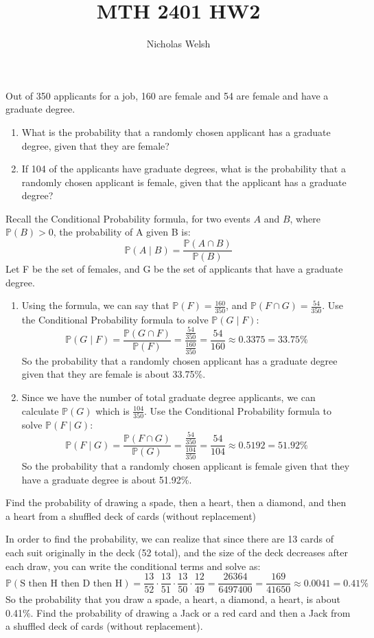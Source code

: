\documentclass{jhwhw}
\author{Nicholas Welsh}
\title{MTH 2401 HW2}
\begin{document}
    \problem{}
        Out of 350 applicants for a job, 160 are female and 54 are female and have a graduate degree.
        \begin{enumerate}[label=(\alph*)]
            \item What is the probability that a randomly chosen applicant has a graduate degree, given
that they are female?
            \item If 104 of the applicants have graduate degrees, what is the probability that a randomly
chosen applicant is female, given that the applicant has a graduate degree?
        \end{enumerate}
    \solution
        Recall the Conditional Probability formula, for two events \(A\) and \(B\), where \(\mathbb{P}(B) > 0\), the probability
        of A given B is:
        \[
            \mathbb{P}(A \mid B) = \frac{\mathbb{P}(A \cap B)}{\mathbb{P}(B)}
        \]
        Let F be the set of females, and G be the set of applicants that have a graduate degree.
        \begin{enumerate}
            \item Using the formula, we can say that \(\mathbb{P}(F) = \frac{160}{350}\), and \(\mathbb{P}(F \cap G) = \frac{54}{350}\).
            Use the Conditional Probability formula to solve \(\mathbb{P}(G \mid F)\):
            \[
                \mathbb{P}(G \mid F) = \frac{\mathbb{P}(G \cap F)}{\mathbb{P}(F)} = \frac{\frac{54}{350}}{\frac{160}{350}} = \frac{54}{160} \approx 0.3375 = 33.75\%
            \]
            So the probability that a randomly chosen applicant has a graduate degree given that they are female is about 33.75\%. 
            \item Since we have the number of total graduate degree applicants, we can calculate \(\mathbb{P}(G)\)  which is \(\frac{104}{350}\). 
            Use the Conditional Probability formula to solve \(\mathbb{P}(F \mid G)\):
            \[
                \mathbb{P}(F \mid G) = \frac{\mathbb{P}(F \cap G)}{\mathbb{P}(G)} = \frac{\frac{54}{350}}{\frac{104}{350}} = \frac{54}{104} \approx 0.5192 = 51.92\%
            \]
            So the probability that a randomly chosen applicant is female given that they have a graduate degree is about 51.92\%. 
        \end{enumerate}

    \problem{}
        Find the probability of drawing a spade, then a heart, then a diamond, and then a heart from
a shuffled deck of cards (without replacement)

    \solution
        In order to find the probability, we can realize that since there are 13 cards of each suit originally in the
        deck (52 total), and the size of the deck decreases after each draw, you can write the conditional terms and solve as:
        \[
            \mathbb{P}(\text{S then H then D then H}) = \frac{13}{52} \cdot \frac{13}{51} \cdot \frac{13}{50} \cdot \frac{12}{49} = \frac{26364}{6497400} = \frac{169}{41650} \approx 0.0041 = 0.41\%
        \]
        So the probability that you draw a spade, a heart, a diamond, a heart, is about 0.41\%.
    \problem{}
        Find the probability of drawing a Jack or a red card and then a Jack from a shuffled deck of
cards (without replacement).
\end{document}

